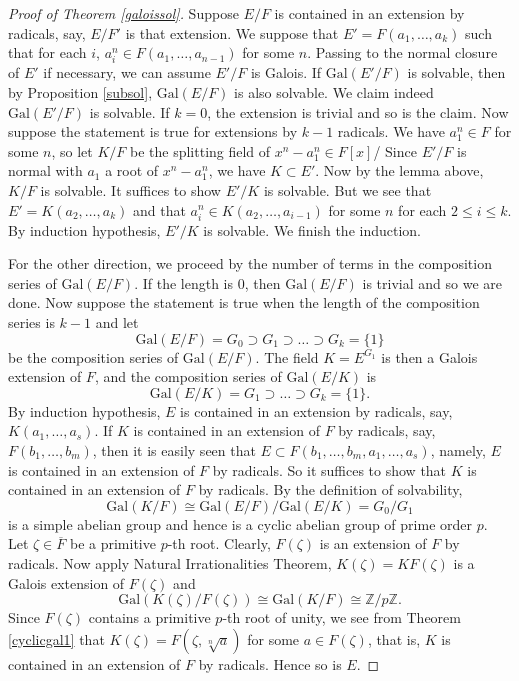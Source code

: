 \documentclass[12pt]{report}
\theoremstyle{definition}
\newcommand{\gal}{\text{Gal}}
\newcommand{\zz}{\mathbb{Z}}
\begin{document}
\begin{proof}[Proof of Theorem \ref{galoissol}]
	Suppose $E/F$ is contained in an extension by radicals, say, $E/F'$ is that extension. We suppose that $E'=F(a_1,\dots,a_k)$ such that for each $i$, $a_i^n\in F(a_1,\dots,a_{n-1})$ for some $n$. Passing to the normal closure of $E'$ if necessary, we can assume $E'/F$ is Galois. If $\gal(E'/F)$ is solvable, then by Proposition \ref{subsol}, $\gal(E/F)$ is also solvable. We claim indeed $\gal(E'/F)$ is solvable. If $k=0$, the extension is trivial and so is the claim. Now suppose the statement is true for extensions by $k-1$ radicals. We have $a_1^n\in F$ for some $n$, so let $K/F$ be the splitting field of $x^n-a_1^n\in F[x]$/ Since $E'/F$ is normal with $a_1$ a root of $x^n-a_1^n$, we have $K\subset E'$. Now by the lemma above, $K/F$ is solvable. It suffices to show $E'/K$ is solvable. But we see that $E'=K(a_2,\dots,a_k)$ and that $a_i^n\in K(a_2,\dots,a_{i-1})$ for some $n$ for each $2\leq i\leq k$. By induction hypothesis, $E'/K$ is solvable. We finish the induction.


	For the other direction, we proceed by the number of terms in the composition series of $\gal(E/F)$. If the length is 0, then $\gal(E/F)$ is trivial and so we are done.
	Now suppose the statement is true when the length of the composition series is $k-1$ and let
	\[\gal(E/F)=G_0\supset G_1\supset \dots\supset G_k=\{1\}\] be the composition series of $\gal(E/F)$. The field $K=E^{G_1}$ is then a Galois extension of $F$, and the composition series of $\gal(E/K)$ is \[\gal(E/K)=G_1\supset \dots\supset G_k=\{1\}.\]
	By induction hypothesis, $E$ is contained in an extension by radicals, say, $K(a_1,\dots,a_s)$. If $K$ is contained in an extension of $F$ by radicals, say, $F(b_1,\dots,b_m)$, then it is easily seen that $E\subset F(b_1,\dots,b_m,a_1,\dots,a_s)$, namely, $E$ is contained in an extension of $F$ by radicals. So it suffices to show that $K$ is contained in an extension of $F$ by radicals. By the definition of solvability, \[\gal(K/F)\cong \gal(E/F)/\gal(E/K) = G_0/G_1\]
	is a simple abelian group and hence is a cyclic abelian group of prime order $p$. Let $\zeta\in \overline{F}$ be a primitive $p$-th root. Clearly, $F(\zeta)$ is an extension of $F$ by radicals. Now apply Natural Irrationalities Theorem, $K(\zeta)=KF(\zeta)$ is a Galois extension of $F(\zeta)$ and \[\gal(K(\zeta)/F(\zeta))\cong \gal(K/F)\cong \zz/p\zz.\] Since $F(\zeta)$ contains a primitive $p$-th root of unity, we see from Theorem \ref{cyclicgal1} that $K(\zeta)=F(\zeta, \sqrt[n]{a})$ for some $a\in F(\zeta)$, that is, $K$ is contained in an extension of $F$ by radicals. Hence so is $E$.
\end{proof}
\end{document}
